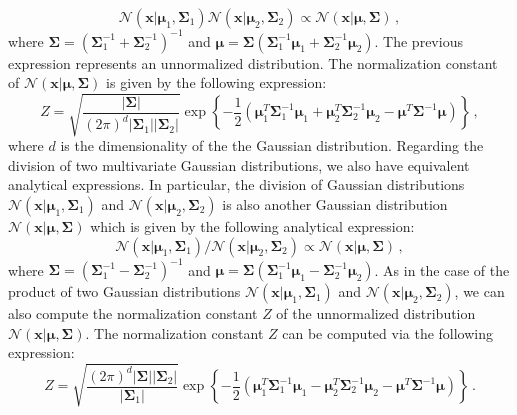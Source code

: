 \begin{equation}
\mathcal{N}(\mathbf{x}|\bm{\mu}_1,\bm{\Sigma}_1) \mathcal{N}(\mathbf{x}|\bm{\mu}_2,\bm{\Sigma}_2) \propto \mathcal{N}(\mathbf{x}|\bm{\mu},\bm{\Sigma})\,,
\label{eq:Appendix_A_product_of_gaussians}
\end{equation}
where $\bm{\Sigma} = \left( \bm{\Sigma}_1^{-1} + \bm{\Sigma}_2^{-1} \right)^{-1}$ and $\bm{\mu} = \bm{\Sigma} \left(  \bm{\Sigma}_1^{-1} \bm{\mu}_1 + \bm{\Sigma}_2^{-1}\bm{\mu}_2 \right)$. The previous expression represents an unnormalized distribution. The normalization constant of $\mathcal{N}(\mathbf{x}|\bm{\mu},\bm{\Sigma})$ is given by the following expression:
\begin{equation}
Z = \sqrt{\frac{|\bm{\Sigma}|}{(2\pi)^d|\bm{\Sigma}_1||\bm{\Sigma}_2|}} 
\exp \left\{ -\frac{1}{2} \left( \bm{\mu}_1^T \bm{\Sigma}_1^{-1} \bm{\mu}_1 + 
\bm{\mu}_2^T \bm{\Sigma}_2^{-1} \bm{\mu}_2 - \bm{\mu}^T \bm{\Sigma}^{-1} \bm{\mu}  \right) \right\} \,,
\end{equation}
where $d$ is the dimensionality of the the Gaussian distribution. Regarding the division of two multivariate Gaussian distributions, we also have equivalent analytical expressions. In particular, the division of Gaussian distributions $\mathcal{N}(\mathbf{x}|\bm{\mu}_1,\bm{\Sigma}_1)$ and $\mathcal{N}(\mathbf{x}|\bm{\mu}_2,\bm{\Sigma}_2)$ is also another Gaussian distribution $\mathcal{N}(\mathbf{x}|\bm{\mu},\bm{\Sigma})$ which is given by the following analytical expression:
\begin{equation}
\mathcal{N}(\mathbf{x}|\bm{\mu}_1,\bm{\Sigma}_1) / \mathcal{N}(\mathbf{x}|\bm{\mu}_2,\bm{\Sigma}_2) \propto \mathcal{N}(\mathbf{x}|\bm{\mu},\bm{\Sigma})\,,
\label{eq:Appendix_A_quotient_of_gaussians}
\end{equation}
where $\bm{\Sigma} = \left( \bm{\Sigma}_1^{-1} - \bm{\Sigma}_2^{-1} \right)^{-1}$ and $\bm{\mu} = \bm{\Sigma} \left(\bm{\Sigma}_1^{-1} \bm{\mu}_1 - \bm{\Sigma}_2^{-1}\bm{\mu}_2 \right)$. As in the case of the product of two Gaussian distributions $\mathcal{N}(\mathbf{x}|\bm{\mu}_1,\bm{\Sigma}_1)$ and $\mathcal{N}(\mathbf{x}|\bm{\mu}_2,\bm{\Sigma}_2)$, we can also compute the normalization constant $Z$ of the unnormalized distribution $\mathcal{N}(\mathbf{x}|\bm{\mu},\bm{\Sigma})$. The normalization constant $Z$ can be computed via the following expression:
\begin{equation}
Z = \sqrt{\frac{(2\pi)^d|\bm{\Sigma}||\bm{\Sigma}_2|}{|\bm{\Sigma}_1|}} 
\exp \left\{ -\frac{1}{2} \left( \bm{\mu}_1^T \bm{\Sigma}_1^{-1} \bm{\mu}_1 - 
\bm{\mu}_2^T \bm{\Sigma}_2^{-1} \bm{\mu}_2 - \bm{\mu}^T \bm{\Sigma}^{-1} \bm{\mu}  \right) \right\} \,.
\end{equation}
